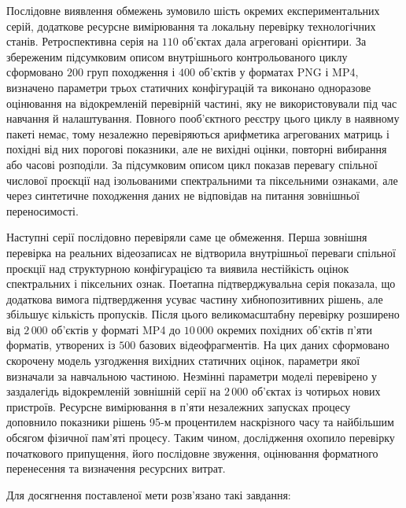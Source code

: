 Послідовне виявлення обмежень зумовило шість окремих експериментальних серій, додаткове ресурсне вимірювання та локальну перевірку технологічних станів. Ретроспективна серія на $110$ об’єктах дала агреговані орієнтири. За збереженим підсумковим описом внутрішнього контрольованого циклу сформовано $200$ груп походження і $400$ об’єктів у форматах PNG і MP4, визначено параметри трьох статичних конфігурацій та виконано одноразове оцінювання на відокремленій перевірній частині, яку не використовували під час навчання й налаштування. Повного пооб’єктного реєстру цього циклу в наявному пакеті немає, тому незалежно перевіряються арифметика агрегованих матриць і похідні від них порогові показники, але не вихідні оцінки, повторні вибирання або часові розподіли. За підсумковим описом цикл показав перевагу спільної числової проєкції над ізольованими спектральними та піксельними ознаками, але через синтетичне походження даних не відповідав на питання зовнішньої переносимості.

Наступні серії послідовно перевіряли саме це обмеження. Перша зовнішня перевірка на реальних відеозаписах не відтворила внутрішньої переваги спільної проєкції над структурною конфігурацією та виявила нестійкість оцінок спектральних і піксельних ознак. Поетапна підтверджувальна серія показала, що додаткова вимога підтвердження усуває частину хибнопозитивних рішень, але збільшує кількість пропусків. Після цього великомасштабну перевірку розширено від $2\,000$ об’єктів у форматі MP4 до $10\,000$ окремих похідних об’єктів п’яти форматів, утворених із $500$ базових відеофрагментів. На цих даних сформовано скорочену модель узгодження вихідних статичних оцінок, параметри якої визначали за навчальною частиною. Незмінні параметри моделі перевірено у заздалегідь відокремленій зовнішній серії на $2\,000$ об’єктах із чотирьох нових пристроїв. Ресурсне вимірювання в п’яти незалежних запусках процесу доповнило показники рішень 95-м процентилем наскрізного часу та найбільшим обсягом фізичної пам’яті процесу. Таким чином, дослідження охопило перевірку початкового припущення, його послідовне звуження, оцінювання форматного перенесення та визначення ресурсних витрат.

Для досягнення поставленої мети розв’язано такі завдання:

